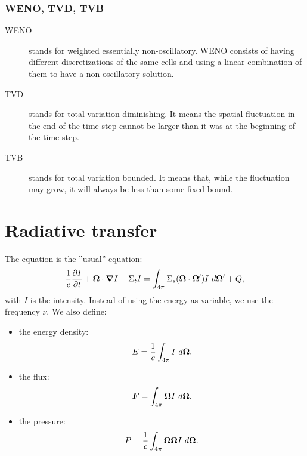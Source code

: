 \subsubsection{WENO, TVD, TVB}
\begin{description}
  \item[WENO] stands for weighted essentially non-oscillatory. WENO consists
    of having different discretizations of the same cells and using a linear
    combination of them to have a non-oscillatory solution.
  \item[TVD] stands for total variation diminishing. It means the spatial
    fluctuation in the end of the time step cannot be larger than it was at the
    beginning of the time step.
  \item[TVB] stands for total variation bounded. It means that, while the
    fluctuation may grow, it will always be less than some fixed bound.
\end{description}

\section{Radiative transfer}
The equation is the ''usual'' equation:
\begin{equation}
  \frac{1}{c}\frac{\partial I}{\partial t} + \boldsymbol{\Omega}\cdot \boldsymbol{\nabla} I + \Sigma_t I =
  \int_{4\pi} \Sigma_s(\boldsymbol{\Omega}\cdot\boldsymbol{\Omega}') I\ d\boldsymbol{\Omega}' + Q,
\end{equation}
with $I$ is the intensity. Instead of using the energy as variable, we use the
frequency $\nu$.  We also define:
\begin{itemize}
  \item the energy density:
    \begin{equation}
      E = \frac{1}{c}\int_{4\pi} I\ d\boldsymbol{\Omega}.
    \end{equation}
  \item the flux:
    \begin{equation}
      \boldsymbol{F} = \int_{4\pi} \boldsymbol{\Omega} I\ d\boldsymbol{\Omega}.
    \end{equation}
  \item the pressure:
    \begin{equation}
      P = \frac{1}{c}\int_{4\pi}\boldsymbol{\Omega}\boldsymbol{\Omega} I\ d\boldsymbol{\Omega}.
    \end{equation}
\end{itemize}

